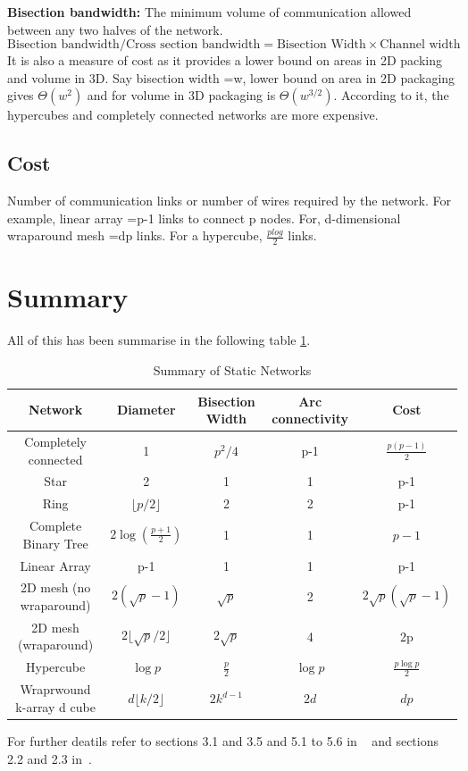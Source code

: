 \documentclass[12pt]{book}
\begin{document}
\textbf{Bisection bandwidth: }The minimum volume of communication allowed between any two halves of the network.
\begin{equation}
    \text{Bisection bandwidth/Cross section bandwidth} = \text{Bisection Width} \times \text{Channel width}
\end{equation}
It is also a measure of cost as it provides a lower bound on areas in 2D packing and volume in 3D.
Say bisection width =w, lower bound on area in 2D packaging gives $\Theta(w^2)$ and for volume in 3D packaging is $\Theta(w^{3/2})$.
According to it, the hypercubes and completely connected networks are more expensive.

\subsection{Cost}
Number of communication links or number of wires required by the network.
For example, linear array =p-1 links to connect p nodes. For, d-dimensional wraparound mesh =dp links.
For a hypercube, $\frac{plog}{2}$ links. 

\section{Summary}
All of this has been summarise in the following table \ref{tab:static_network}. 
\begin{table}[H]
    \centering
    \begin{tabular}{|c|c|c|c|c|}
        \hline
        Network & Diameter & Bisection Width & Arc connectivity & Cost  \\
        \hline
        Completely connected & 1 & $p^2/4$ & p-1 & $\frac{p(p-1)}{2}$ \\
        Star & 2 & 1 & 1 & p-1 \\
        Ring & $\lfloor p/2 \rfloor$ & 2 & 2 & p-1 \\
        Complete Binary Tree & $2\log(\frac{p+1}{2})$ & 1 & 1 & $p-1$ \\
        Linear Array & p-1 & 1 & 1 & p-1 \\
        2D mesh (no wraparound) & $2(\sqrt{p}-1)$ & $\sqrt{p}$ & 2 & $2\sqrt{p}(\sqrt{p}-1)$ \\
        2D mesh (wraparound) & $2\lfloor\sqrt{p}/2\rfloor$ & $2\sqrt{p}$ & 4 & 2p \\
        Hypercube & $\log p$ & $\frac{p}{2}$ & $\log p$ & $\frac{p \log p}{2}$ \\
        Wraprwound k-array d cube & $d \lfloor k/2\rfloor$ & $2k^{d-1}$ & $2d$ & $dp$ \\ 
        \hline
    \end{tabular}
    \caption{Summary of Static Networks}
    \label{tab:static_network}
\end{table}
For further deatils refer to sections 3.1 and 3.5 and 5.1 to 5.6 in ~\cite{grama2008introduction} and sections 2.2 and 2.3 in~\cite{culler1998parallel}.
\end{document}
